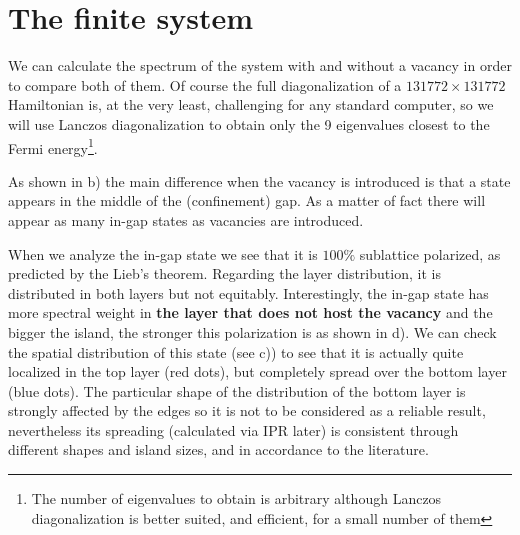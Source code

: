 \section{The finite system}
We can calculate the spectrum of the system with and without a vacancy in order to compare both of them. Of course the full diagonalization of a $131772\times131772$ Hamiltonian is, at the very least, challenging for any standard computer, so we will use Lanczos diagonalization\cite{Lanczos1950, Ojalvo1970, Arnoldi1951} to obtain only the 9 eigenvalues closest to the Fermi energy\footnote{The number of eigenvalues to obtain is arbitrary although Lanczos diagonalization is better suited, and efficient, for a small number of them}.

As shown in b) the main difference when the vacancy is introduced is that a state appears in the middle of the (confinement) gap. As a matter of fact there will appear as many in-gap states as vacancies are introduced.

When we analyze the in-gap state we see that it is $100\%$ sublattice polarized, as predicted by the Lieb's theorem\cite{Lieb1989}. Regarding the layer distribution, it is distributed in both layers but not equitably. Interestingly, the in-gap state has more spectral weight in \textbf{the layer that does not host the vacancy} and the bigger the island, the stronger this polarization is as shown in d).
We can check the spatial distribution of this state (see c)) to see that it is actually quite localized in the top layer (red dots), but completely spread over the bottom layer (blue dots). The particular shape of the distribution of the bottom layer is strongly affected by the edges so it is not to be considered as a reliable result, nevertheless its spreading (calculated via IPR later) is consistent through different shapes and island sizes, and in accordance to the literature\cite{Castro2010}.




